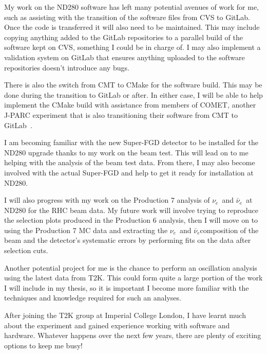 \documentclass[aps,pra,12pt,notitlepage,tightenlines]{revtex4-1}
\newcommand{\nue}{$\nu_e$}
\newcommand{\anue}{$\bar\nu_e$}
\begin{document}
My work on the ND280 software has left many potential avenues of work for me, such as assisting with the transition of the software files from CVS to GitLab. Once the code is transferred it will also need to be maintained. This may include copying anything added to the GitLab repositories to a parallel build of the software kept on CVS, something I could be in charge of. I may also implement a validation system on GitLab that ensures anything uploaded to the software repositories doesn't introduce any bugs.

There is also the switch from CMT to CMake for the software build. This may be done during the transition to GitLab or after. In either case, I will be able to help implement the CMake build with assistance from members of COMET, another J-PARC experiment that is also transitioning their software from CMT to GitLab~\cite{Wu2017}.

I am becoming familiar with the new Super-FGD detector to be installed for the ND280 upgrade thanks to my work on the beam test. This will lead on to me helping with the analysis of the beam test data. From there, I may also become involved with the actual Super-FGD and help to get it ready for installation at ND280.

I will also progress with my work on the Production 7 analysis of \nue \ and \anue \ at ND280 for the RHC beam data. My future work will involve trying to reproduce the selection plots produced in the Production 6 analysis, then I will move on to using the Production 7 MC data and extracting the \nue \ and \anue composition of the beam and the detector's systematic errors by performing fits on the data after selection cuts. 

Another potential project for me is the chance to perform an oscillation analysis using the latest data from T2K. This could form quite a large portion of the work I will include in my thesis, so it is important I become more familiar with the techniques and knowledge required for such an analyses.

After joining the T2K group at Imperial College London, I have learnt much about the experiment and gained experience working with software and hardware. Whatever happens over the next few years, there are plenty of exciting options to keep me busy!




\end{document}
